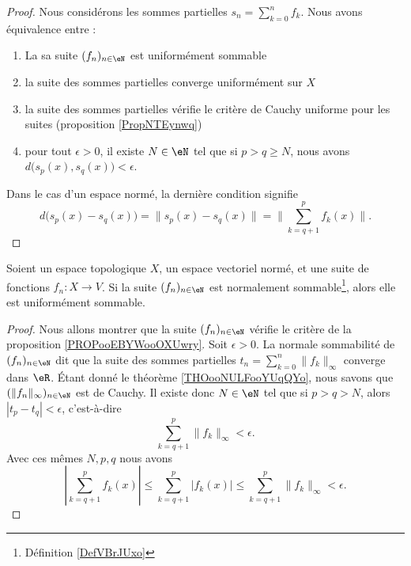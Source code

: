 \begin{proof}
	Nous considérons les sommes partielles \( s_n=\sum_{k=0}^nf_k\). Nous avons équivalence entre :
	\begin{enumerate}
		\item
		      La sa suite \( (f_n)_{n\in \eN}\) est uniformément sommable
		\item
		      la suite des sommes partielles converge uniformément sur \( X\)
		\item
		      la suite des sommes partielles vérifie le critère de Cauchy uniforme pour les suites (proposition \ref{PropNTEynwq})
		\item
		      pour tout \( \epsilon>0\), il existe \( N\in \eN\) tel que si \( p>q\geq N\), nous avons \( d\big( s_p(x),s_q(x) \big)<\epsilon\).
	\end{enumerate}
	Dans le cas d'un espace normé, la dernière condition signifie
	\begin{equation}
		d\big( s_p(x)-s_q(x) \big)=\| s_p(x)-s_q(x) \|=\| \sum_{k=q+1}^pf_k(x) \|.
	\end{equation}
\end{proof}


\begin{lemma}       \label{LEMooJZTBooIopLok}
	Soient un espace topologique \( X\), un espace vectoriel normé, et une suite de fonctions \( f_n\colon X\to V\). Si la suite \( (f_n)_{n\in \eN}\) est normalement sommable\footnote{Définition \ref{DefVBrJUxo}}, alors elle est uniformément sommable.
\end{lemma}

\begin{proof}
	Nous allons montrer que la suite \( (f_n)_{n\in \eN}\) vérifie le critère de la proposition \ref{PROPooEBYWooOXUwry}. Soit \( \epsilon>0\). La normale sommabilité de \( (f_n)_{n\in \eN} \) dit que la suite des sommes partielles \( t_n=\sum_{k=0}^n\| f_k \|_{\infty}\) converge dans \( \eR\). Étant donné le théorème \ref{THOooNULFooYUqQYo}, nous savons que \( (\| f_n \|_{\infty})_{n\in \eN}\) est de Cauchy. Il existe donc \( N\in \eN\) tel que si \( p>q>N\), alors \( | t_p-t_q |<\epsilon\), c'est-à-dire
	\begin{equation}
		\sum_{k=q+1}^p\| f_k \|_{\infty}<\epsilon.
	\end{equation}
	Avec ces mêmes \( N,p,q\) nous avons
	\begin{equation}
		| \sum_{k=q+1}^pf_k(x) |\leq\sum_{k=q+1}^p| f_k(x) |\leq\sum_{k=q+1}^p\| f_k \|_{\infty}<\epsilon.
	\end{equation}
\end{proof}

